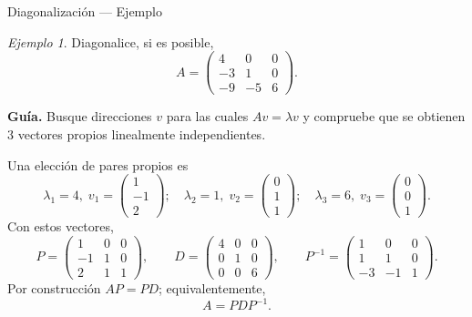 \documentclass[aspectratio=169,11pt]{beamer}
\theoremstyle{remark}
\newtheorem{Ejem}[definicion]{Ejemplo}
\providecommand{\paragraph}[1]{\medskip\textbf{#1.}\enspace}
\begin{document}
\begin{frame}[shrink=5]{Diagonalización — Ejemplo}
\footnotesize
\begin{Ejem}

Diagonalice, si es posible,
\[
A=\begin{pmatrix}4 & 0 & 0\\-3 & 1 & 0\\-9 & -5 & 6\end{pmatrix}.
\]

\paragraph{Guía}
Busque direcciones $v$ para las cuales $Av=\lambda v$ y compruebe que se obtienen $3$ vectores propios linealmente independientes.

\scriptsize
Una elección de pares propios es
\[
\lambda_1=4,\;v_1=\begin{pmatrix}1\\-1\\2\end{pmatrix};\quad \lambda_2=1,\;v_2=\begin{pmatrix}0\\1\\1\end{pmatrix};\quad \lambda_3=6,\;v_3=\begin{pmatrix}0\\0\\1\end{pmatrix}.
\]
Con estos vectores,
\[
P=\begin{pmatrix}1 & 0 & 0\\-1 & 1 & 0\\2 & 1 & 1\end{pmatrix},\qquad D=\begin{pmatrix}4 & 0 & 0\\0 & 1 & 0\\0 & 0 & 6\end{pmatrix},\qquad P^{-1}=\begin{pmatrix}1 & 0 & 0\\1 & 1 & 0\\-3 & -1 & 1\end{pmatrix}.
\]
Por construcción $AP=PD$; equivalentemente,
\[
\boxed{A=PDP^{-1}}.
\]
\end{Ejem}
\end{frame}
\end{document}
